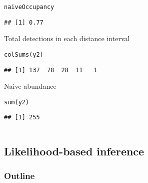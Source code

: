 \documentclass[color=usenames,dvipsnames]{beamer}\usepackage[]{graphicx}\usepackage[]{color}
\makeatletter
\newcommand{\hlstd}[1]{\textcolor[rgb]{0,0,0}{#1}}%
\newcommand{\hlkwd}[1]{\textcolor[rgb]{0.004,0.004,0.506}{#1}}%
\newenvironment{kframe}{%
 \def\at@end@of@kframe{}%
 \ifinner\ifhmode%
  \def\at@end@of@kframe{\end{minipage}}%
  \begin{minipage}{\columnwidth}%
 \fi\fi%
 \def\FrameCommand##1{\hskip\@totalleftmargin \hskip-\fboxsep
 \colorbox{shadecolor}{##1}\hskip-\fboxsep
     \hskip-\linewidth \hskip-\@totalleftmargin \hskip\columnwidth}%
 \MakeFramed {\advance\hsize-\width
   \@totalleftmargin\z@ \linewidth\hsize
   \@setminipage}}%
 {\par\unskip\endMakeFramed%
 \at@end@of@kframe}
\newenvironment{knitrout}{}{} %
\makeatother
\begin{document}
\begin{frame}[fragile]
\begin{columns}
\begin{column}{0.6\textwidth}
\begin{knitrout}
\begin{kframe}
\begin{alltt}
\hlstd{naiveOccupancy}
\end{alltt}
\begin{verbatim}
## [1] 0.77
\end{verbatim}
\end{kframe}
\end{knitrout}
  \pause
  \vfill
  \small
  Total detections in each distance interval
  \vspace{-6pt}
\begin{knitrout}\scriptsize
{}\color{fgcolor}\begin{kframe}
\begin{alltt}
\hlkwd{colSums}\hlstd{(y2)}
\end{alltt}
\begin{verbatim}
## [1] 137  78  28  11   1
\end{verbatim}
\end{kframe}
\end{knitrout}
  \pause
  \vfill
  Naive abundance
  \vspace{-6pt}
\begin{knitrout}\scriptsize
{}\color{fgcolor}\begin{kframe}
\begin{alltt}
\hlkwd{sum}\hlstd{(y2)}
\end{alltt}
\begin{verbatim}
## [1] 255
\end{verbatim}
\end{kframe}
\end{knitrout}

  \end{column}
  \end{columns}
\end{frame}









\subsection{Likelihood-based inference}


\begin{frame}
  \frametitle{Outline}
  \Large
  \tableofcontents[currentsection]
\end{frame}
\end{document}
